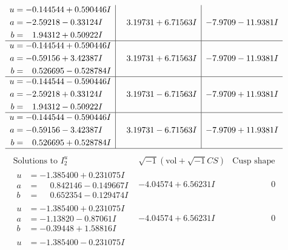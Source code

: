 \documentclass[1p]{elsarticle_modified}
\theoremstyle{definition}
\newcommand{\I}{\sqrt{-1}}
\begin{document}
$$\begin{array}{c|c|c}
\begin{aligned}
u &= -0.144544 + 0.590446 I \\
a &= -2.59218 - 0.33124 I \\
b &= \phantom{-}1.94312 + 0.50922 I\end{aligned}
 & \phantom{-}3.19731 + 6.71563 I & -7.9709 - 11.9381 I \\ \hline\begin{aligned}
u &= -0.144544 + 0.590446 I \\
a &= -0.59156 + 3.42387 I \\
b &= \phantom{-}0.526695 - 0.528784 I\end{aligned}
 & \phantom{-}3.19731 + 6.71563 I & -7.9709 - 11.9381 I \\ \hline\begin{aligned}
u &= -0.144544 - 0.590446 I \\
a &= -2.59218 + 0.33124 I \\
b &= \phantom{-}1.94312 - 0.50922 I\end{aligned}
 & \phantom{-}3.19731 - 6.71563 I & -7.9709 + 11.9381 I \\ \hline\begin{aligned}
u &= -0.144544 - 0.590446 I \\
a &= -0.59156 - 3.42387 I \\
b &= \phantom{-}0.526695 + 0.528784 I\end{aligned}
 & \phantom{-}3.19731 - 6.71563 I & -7.9709 + 11.9381 I\\
 \hline 
 \end{array}$$\newpage$$\begin{array}{c|c|c}  
\text{Solutions to }I^u_{2}& \I (\text{vol} + \sqrt{-1}CS) & \text{Cusp shape}\\
 \hline 
\begin{aligned}
u &= -1.385400 + 0.231075 I \\
a &= \phantom{-}0.842146 - 0.149667 I \\
b &= \phantom{-}0.652354 - 0.129474 I\end{aligned}
 & -4.04574 + 6.56231 I & \phantom{-0.000000 } 0 \\ \hline\begin{aligned}
u &= -1.385400 + 0.231075 I \\
a &= -1.13820 - 0.87061 I \\
b &= -0.39448 + 1.58816 I\end{aligned}
 & -4.04574 + 6.56231 I & \phantom{-0.000000 } 0 \\ \hline\begin{aligned}
u &= -1.385400 - 0.231075 I \\

\end{aligned}
\end{array}$$
\end{document}
